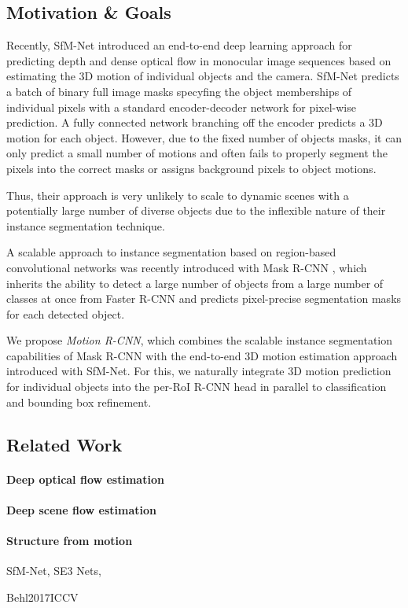 \subsection{Motivation \& Goals}


Recently, SfM-Net \cite{} introduced an end-to-end deep learning approach for predicting depth
and dense optical flow in monocular image sequences based on estimating the 3D motion of individual objects and the camera.
SfM-Net predicts a batch of binary full image masks specyfing the object memberships of individual pixels with a standard encoder-decoder
network for pixel-wise prediction. A fully connected network branching off the encoder predicts a 3D motion for each object.
However, due to the fixed number of objects masks, it can only predict a small number of motions and
often fails to properly segment the pixels into the correct masks or assigns background pixels to object motions.

Thus, their approach is very unlikely to scale to dynamic scenes with a potentially
large number of diverse objects due to the inflexible nature of their instance segmentation technique.

A scalable approach to instance segmentation based on region-based convolutional networks
was recently introduced with Mask R-CNN \cite{}, which inherits the ability to detect
a large number of objects from a large number of classes at once from Faster R-CNN
and predicts pixel-precise segmentation masks for each detected object.

We propose \emph{Motion R-CNN}, which combines the scalable instance segmentation capabilities of
Mask R-CNN with the end-to-end 3D motion estimation approach introduced with SfM-Net.
For this, we naturally integrate 3D motion prediction for individual objects into the per-RoI R-CNN head
in parallel to classification and bounding box refinement.

\subsection{Related Work}

\paragraph{Deep optical flow estimation}
\paragraph{Deep scene flow estimation}
\paragraph{Structure from motion}
SfM-Net, SE3 Nets,


Behl2017ICCV
